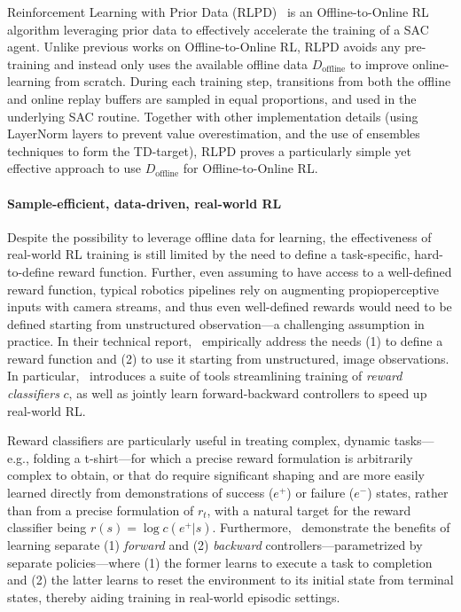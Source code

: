 Reinforcement Learning with Prior Data (RLPD)~\citep{ballEfficientOnlineReinforcement2023} is an Offline-to-Online RL algorithm leveraging prior data to effectively accelerate the training of a SAC agent.
Unlike previous works on Offline-to-Online RL, RLPD avoids any pre-training and instead only uses the available offline data \( D_\text{offline} \) to improve online-learning from scratch.
During each training step, transitions from both the offline and online replay buffers are sampled in equal proportions, and used in the underlying SAC routine.
Together with other implementation details (using LayerNorm layers to prevent value overestimation, and the use of ensembles techniques to form the TD-target), RLPD proves a particularly simple yet effective approach to use \( D_\text{offline} \) for Offline-to-Online RL.

\paragraph{Sample-efficient, data-driven, real-world RL}
Despite the possibility to leverage offline data for learning, the effectiveness of real-world RL training is still limited by the need to define a task-specific, hard-to-define reward function.
Further, even assuming to have access to a well-defined reward function, typical robotics pipelines rely on augmenting propioperceptive inputs with camera streams, and thus even well-defined rewards would need to be defined starting from unstructured observation---a challenging assumption in practice.
In their technical report,~\citet{luoSERLSoftwareSuite2025} empirically address the needs (1) to define a reward function and (2) to use it starting from unstructured, image observations.
In particular,~\citet[SERL]{luoSERLSoftwareSuite2025} introduces a suite of tools streamlining training of \emph{reward classifiers} \( c \), as well as jointly learn forward-backward controllers to speed up real-world RL.

Reward classifiers are particularly useful in treating complex, dynamic tasks---e.g., folding a t-shirt---for which a precise reward formulation is arbitrarily complex to obtain, or that do require significant shaping and are more easily learned directly from demonstrations of success (\(e^+\)) or failure (\(e^-\)) states, rather than from a precise formulation of \( r_t \), with a natural target for the reward classifier being \( r(s) = \log c(e^+ \vert s ) \).
Furthermore,~\citet{luoSERLSoftwareSuite2025} demonstrate the benefits of learning separate (1) \emph{forward} and (2) \emph{backward} controllers---parametrized by separate policies---where (1) the former learns to execute a task to completion and (2) the latter learns to reset the environment to its initial state from terminal states, thereby aiding training in real-world episodic settings.

